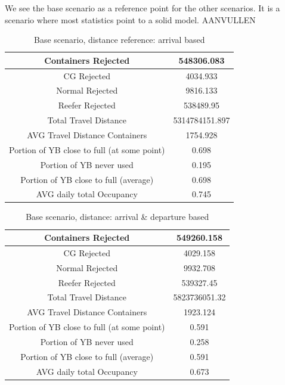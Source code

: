 \documentclass{article}
\begin{document}
We see the base scenario as a reference point for the other scenarios. It is a
scenario where most statistics point to a solid model. AANVULLEN
\begin{table}[h]
    \centering
    \begin{tabular}{|c|c|}
        \hline
        Containers Rejected                         & 548306.083     \\ \hline
        CG Rejected                                 & 4034.933       \\ \hline
        Normal Rejected                             & 9816.133       \\ \hline
        Reefer Rejected                             & 538489.95      \\ \hline
        Total Travel Distance                       & 5314784151.897 \\ \hline
        AVG Travel Distance Containers              & 1754.928       \\ \hline
        Portion of YB close to full (at some point) & 0.698          \\ \hline
        Portion of YB never used                    & 0.195          \\ \hline
        Portion of YB close to full (average)       & 0.698          \\ \hline
        AVG daily total Occupancy                   & 0.745          \\ \hline
    \end{tabular}
    \caption{Base scenario, distance reference: arrival based}
\end{table}
\begin{table}[h]
    \centering
    \begin{tabular}{|c|c|}
        \hline
        Containers Rejected                         & 549260.158    \\ \hline
        CG Rejected                                 & 4029.158      \\ \hline
        Normal Rejected                             & 9932.708      \\ \hline
        Reefer Rejected                             & 539327.45     \\ \hline
        Total Travel Distance                       & 5823736051.32 \\ \hline
        AVG Travel Distance Containers              & 1923.124      \\ \hline
        Portion of YB close to full (at some point) & 0.591         \\ \hline
        Portion of YB never used                    & 0.258         \\ \hline
        Portion of YB close to full (average)       & 0.591         \\ \hline
        AVG daily total Occupancy                   & 0.673         \\ \hline
    \end{tabular}
    \caption{Base scenario, distance: arrival \& departure based}
\end{table}
\end{document}
